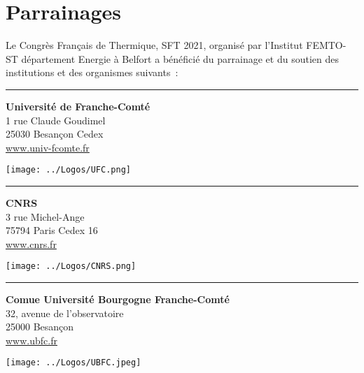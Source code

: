 \chapter{Parrainages}

Le Congrès Français de Thermique, SFT 2021, organisé par l’Institut FEMTO-ST département Energie à Belfort a bénéficié du parrainage et du soutien des institutions et des organismes suivants :\\[1em]
\hrule
%
\vspace{1.5mm}
\noindent
\begin{minipage}{0.55\textwidth}
\textbf{Université de Franche-Comté}\\
1 rue Claude Goudimel\\
25030 Besançon Cedex\\
\url{www.univ-fcomte.fr}
\end{minipage}
\begin{minipage}{0.43\textwidth}
\texttt{[image: ../Logos/UFC.png]}
\end{minipage}
\vspace{1.5mm}
\hrule
%
\vspace{1.5mm}
\noindent
\begin{minipage}{0.55\textwidth}
\textbf{CNRS}\\
3 rue Michel-Ange\\
75794 Paris Cedex 16\\
\url{www.cnrs.fr}
\end{minipage}
\begin{minipage}{0.43\textwidth}
	\centering \texttt{[image: ../Logos/CNRS.png]}
\end{minipage}
\vspace{1.5mm}
\hrule
%
\vspace{1.5mm}
\noindent
\begin{minipage}{0.55\textwidth}
	\textbf{Comue Université Bourgogne Franche-Comté}\\
	32, avenue de l’observatoire\\
	25000 Besançon\\
	\url{www.ubfc.fr}
\end{minipage}
\begin{minipage}{0.43\textwidth}
	\centering \texttt{[image: ../Logos/UBFC.jpeg]}
\end{minipage}
\vspace{1.5mm}
